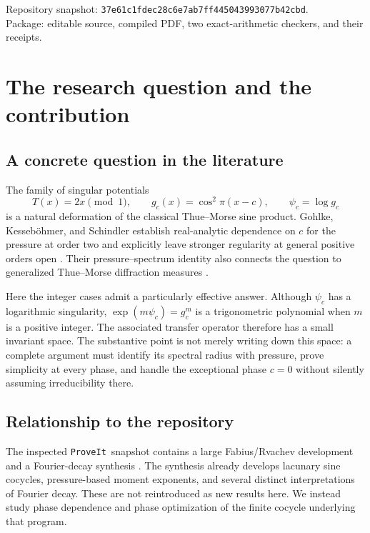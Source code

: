 \documentclass[11pt,a4paper]{article}
\numberwithin{equation}{section}
\theoremstyle{definition}
\theoremstyle{remark}
\newcommand{\repo}{\texttt{ProveIt}}
\begin{document}
\begin{titlepage}
\begin{abstract}
The article supplies proofs, explicit matrices, recurrence formulas,
reproducible exact-arithmetic checks, a connection to the Fabius/Rvachev
Fourier program, and a proposed research agenda. The new claims are
research results argued here, not independently refereed conclusions or
Lean-verified theorems. Prior moment-matrix methods are explicitly credited.
\end{abstract}
\vfill
{\small\color{muted} Repository snapshot: \nolinkurl{37e61c1fdec28c6e7ab7ff445043993077b42cbd}.\\
Package: editable source, compiled PDF, two exact-arithmetic checkers, and their receipts.}
\end{titlepage}
\hypersetup{pageanchor=true}
\tableofcontents
\newpage

\section{The research question and the contribution}
\label{sec:intro}

\subsection{A concrete question in the literature}
The family of singular potentials
\[
 T(x)=2x\pmod 1,\qquad
 g_c(x)=\cos^2\!\pi(x-c),\qquad \psi_c=\log g_c
\]
is a natural deformation of the classical Thue--Morse sine product.
Gohlke, Kesseb\"ohmer, and Schindler establish real-analytic dependence on
$c$ for the pressure at order two and explicitly leave stronger regularity
at general positive orders open \cite[Theorem~2.7 and following discussion]{GKS}.
Their pressure--spectrum identity also connects the question to generalized
Thue--Morse diffraction measures \cite[Theorem~2.6]{GKS}.

Here the integer cases admit a particularly effective answer. Although
$\psi_c$ has a logarithmic singularity, $\exp(m\psi_c)=g_c^m$ is a
trigonometric polynomial when $m$ is a positive integer. The associated
transfer operator therefore has a small invariant space. The substantive
point is not merely writing down this space: a complete argument must
identify its spectral radius with pressure, prove simplicity at every phase,
and handle the exceptional phase $c=0$ without silently assuming
irreducibility there.

\subsection{Relationship to the repository}
The inspected \repo\ snapshot contains a large Fabius/Rvachev development
and a Fourier-decay synthesis \cite{ProveIt,RepoFourier}. The synthesis
already develops lacunary sine cocycles, pressure-based moment exponents,
and several distinct interpretations of Fourier decay. These are not
reintroduced as new results here. We instead study phase dependence and
phase optimization of the finite cocycle underlying that program.
\end{document}
